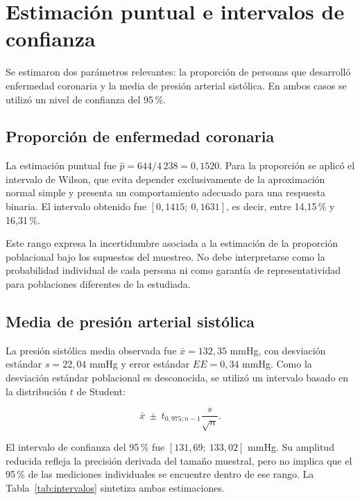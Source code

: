 \documentclass[11pt,a4paper]{article}
\begin{document}
\section{Estimación puntual e intervalos de confianza}

Se estimaron dos parámetros relevantes: la proporción de personas que desarrolló enfermedad coronaria y la media de presión arterial sistólica. En ambos casos se utilizó un nivel de confianza del 95\,\%.

\subsection{Proporción de enfermedad coronaria}

La estimación puntual fue $\hat{p}=644/4\,238=0,1520$. Para la proporción se aplicó el intervalo de Wilson, que evita depender exclusivamente de la aproximación normal simple y presenta un comportamiento adecuado para una respuesta binaria. El intervalo obtenido fue $[0,1415;\ 0,1631]$, es decir, entre 14,15\,\% y 16,31\,\%.

Este rango expresa la incertidumbre asociada a la estimación de la proporción poblacional bajo los supuestos del muestreo. No debe interpretarse como la probabilidad individual de cada persona ni como garantía de representatividad para poblaciones diferentes de la estudiada.

\subsection{Media de presión arterial sistólica}

La presión sistólica media observada fue $\bar{x}=132,35$ mmHg, con desviación estándar $s=22,04$ mmHg y error estándar $EE=0,34$ mmHg. Como la desviación estándar poblacional es desconocida, se utilizó un intervalo basado en la distribución $t$ de Student:

\[
\bar{x}\ \pm\ t_{0,975;n-1}\frac{s}{\sqrt{n}}.
\]

El intervalo de confianza del 95\,\% fue $[131,69;\ 133,02]$ mmHg. Su amplitud reducida refleja la precisión derivada del tamaño muestral, pero no implica que el 95\,\% de las mediciones individuales se encuentre dentro de ese rango. La Tabla~\ref{tab:intervalos} sintetiza ambas estimaciones.
\end{document}
